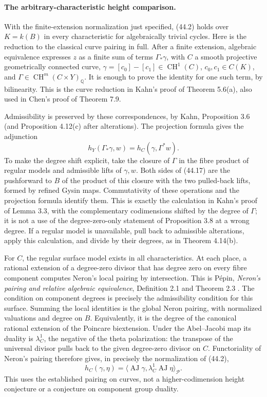 \documentclass[11pt,a4paper]{article}
\theoremstyle{definition}
\theoremstyle{remark}
\begin{document}
\paragraph{The arbitrary-characteristic height comparison.}
With the finite-extension normalization just specified, (44.2)
holds over $K=k(B)$ in every characteristic for algebraically
trivial cycles.  Here is the reduction to the classical curve
pairing in full.  After a finite extension, algebraic equivalence
expresses $z$ as a finite sum of terms $\Gamma_*\gamma$, with
$C$ a smooth projective geometrically connected curve,
$\gamma=[c_0]-[c_1]\in\operatorname{CH}^1(C)$,
$c_0,c_1\in C(K)$, and
$\Gamma\in\operatorname{CH}^m(C\times Y)_{\mathbb Q}$.
It is enough to prove the identity for one such term, by
bilinearity.  This is the curve reduction in Kahn's proof of
Theorem 5.6(a), also used in Chen's proof of Theorem 7.9.

Admissibility is preserved by these correspondences, by Kahn,
Proposition 3.6 (and Proposition 4.12(c) after alterations).
The projection formula gives the adjunction
\[
 h_Y(\Gamma_*\gamma,w)=h_C(\gamma,\Gamma^*w).               \tag{44.17}
\]
To make the degree shift explicit, take the closure of $\Gamma$
in the fibre product of regular models and admissible lifts of
$\gamma,w$.  Both sides of (44.17) are the pushforward to $B$ of
the product of this closure with the two pulled-back lifts,
formed by refined Gysin maps.  Commutativity of these operations
and the projection formula identify them.  This is exactly the
calculation in Kahn's proof of Lemma 3.3, with the complementary
codimensions shifted by the degree of $\Gamma$; it is not a use
of the degree-zero-only statement of Proposition 3.8 at a wrong
degree.  If a regular model is unavailable, pull back to admissible
alterations, apply this calculation, and divide by their degrees,
as in Theorem 4.14(b).

For $C$, the regular surface model exists in all characteristics.
At each place, a rational extension of a degree-zero divisor that
has degree zero on every fibre component computes Neron's local
pairing by intersection.  This is P\'epin,
\emph{Neron's pairing and relative algebraic equivalence},
Definition 2.1 and Theorem 2.3 \cite{PepinNeron2011}.
The condition on component degrees is precisely the admissibility
condition for this surface.  Summing the local identities is the
global Neron pairing, with normalized valuations and degree on $B$.
Equivalently, it is the degree of the canonical rational extension
of the Poincare biextension.  Under the Abel--Jacobi map its
duality is $\lambda_C^1$, the negative of the theta polarization:
the transpose of the universal divisor pulls back to the given
degree-zero divisor on $C$.  Functoriality of Neron's pairing
therefore gives, in precisely the normalization of (44.2),
\[
 h_C(\gamma,\eta)
 =\langle\operatorname{AJ}\gamma,
                 \lambda_C^1\operatorname{AJ}\eta\rangle_{\mathcal P}.
                                                               \tag{44.18}
\]
This uses the established pairing on curves, not a
higher-codimension height conjecture or a conjecture on component
group duality.
\end{document}
